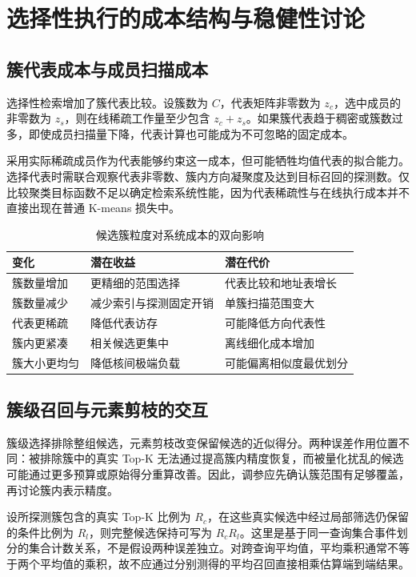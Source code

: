 \section{选择性执行的成本结构与稳健性讨论}
\subsection{簇代表成本与成员扫描成本}
选择性检索增加了簇代表比较。设簇数为 $C$，代表矩阵非零数为 $z_c$，选中成员的非零数为 $z_s$，则在线稀疏工作量至少包含 $z_c+z_s$。如果簇代表趋于稠密或簇数过多，即使成员扫描量下降，代表计算也可能成为不可忽略的固定成本。

采用实际稀疏成员作为代表能够约束这一成本，但可能牺牲均值代表的拟合能力。选择代表时需联合观察代表非零数、簇内方向凝聚度及达到目标召回的探测数。仅比较聚类目标函数不足以确定检索系统性能，因为代表稀疏性与在线执行成本并不直接出现在普通 K-means 损失中。

\begin{table}[htbp]\centering\caption{候选簇粒度对系统成本的双向影响}
\begin{tabularx}{\textwidth}{p{2.6cm}XX}\toprule
变化&潜在收益&潜在代价\\\midrule
簇数量增加&更精细的范围选择&代表比较和地址表增长\\
簇数量减少&减少索引与探测固定开销&单簇扫描范围变大\\
代表更稀疏&降低代表访存&可能降低方向代表性\\
簇内更紧凑&相关候选更集中&离线细化成本增加\\
簇大小更均匀&降低核间极端负载&可能偏离相似度最优划分\\\bottomrule
\end{tabularx}\end{table}

\subsection{簇级召回与元素剪枝的交互}
簇级选择排除整组候选，元素剪枝改变保留候选的近似得分。两种误差作用位置不同：被排除簇中的真实 Top-K 无法通过提高簇内精度恢复，而被量化扰乱的候选可能通过更多预算或原始得分重算改善。因此，调参应先确认簇范围有足够覆盖，再讨论簇内表示精度。

设所探测簇包含的真实 Top-K 比例为 $R_c$，在这些真实候选中经过局部筛选仍保留的条件比例为 $R_l$，则完整候选保持可写为 $R_cR_l$。这里是基于同一查询集合事件划分的集合计数关系，不是假设两种误差独立。对跨查询平均值，平均乘积通常不等于两个平均值的乘积，故不应通过分别测得的平均召回直接相乘估算端到端结果。

